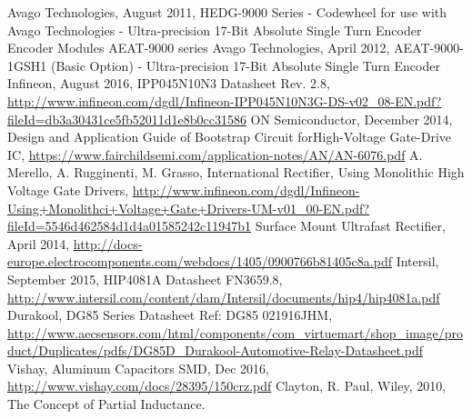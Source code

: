 \begin{thebibliography}{21} %
	Avago Technologies, August 2011, HEDG-9000 Series - Codewheel for use with Avago Technologies - Ultra-precision 17-Bit Absolute Single Turn Encoder
Encoder Modules AEAT-9000 series
	Avago Technologies, April 2012, AEAT-9000-1GSH1 (Basic Option) - Ultra-precision 17-Bit Absolute Single Turn Encoder
	Infineon, August 2016, IPP045N10N3 Datasheet Rev. 2.8, \url{http://www.infineon.com/dgdl/Infineon-IPP045N10N3G-DS-v02_08-EN.pdf?fileId=db3a30431ce5fb52011d1e8b0cc31586}
	ON Semiconductor, December 2014, Design and Application Guide of Bootstrap Circuit forHigh-Voltage Gate-Drive IC, \url{https://www.fairchildsemi.com/application-notes/AN/AN-6076.pdf}
	A. Merello, A. Rugginenti, M. Grasso, International Rectifier, Using Monolithic High Voltage Gate Drivers, \url{http://www.infineon.com/dgdl/Infineon-Using+Monolithci+Voltage+Gate+Drivers-UM-v01_00-EN.pdf?fileId=5546d462584d1d4a01585242c11947b1}
	Surface Mount Ultrafast Rectifier, April 2014, \url{http://docs-europe.electrocomponents.com/webdocs/1405/0900766b81405c8a.pdf}
	Intersil, September 2015, HIP4081A Datasheet FN3659.8, \url{http://www.intersil.com/content/dam/Intersil/documents/hip4/hip4081a.pdf}
	Durakool, DG85 Series Datasheet Ref: DG85 021916JHM, \url{http://www.aecsensors.com/html/components/com_virtuemart/shop_image/product/Duplicates/pdfs/DG85D_Durakool-Automotive-Relay-Datasheet.pdf}
	Vishay, Aluminum Capacitors SMD,  Dec 2016, \url{http://www.vishay.com/docs/28395/150crz.pdf}
	Clayton, R. Paul, Wiley, 2010, The Concept of Partial Inductance. 
\end{thebibliography}
